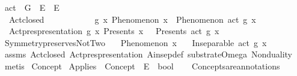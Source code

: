 \begin{isabellebody}
\ act\ {\isacharcolon}{\kern0pt}{\isacharcolon}{\kern0pt}\ {\isachardoublequoteopen}G\ {\isasymRightarrow}\ E\ {\isasymRightarrow}\ E{\isachardoublequoteclose}\ \ \ \isanewline
\isanewline
{}\isamarkupfalse%
\ \isanewline
\ \ Act{\isacharunderscore}{\kern0pt}closed{\isacharcolon}{\kern0pt}\ \ \ \ \ \ \ \ \ \ \ \ {\isachardoublequoteopen}{\isasymforall}g\ x{\isachardot}{\kern0pt}\ Phenomenon\ x\ {\isasymlongrightarrow}\ Phenomenon\ {\isacharparenleft}{\kern0pt}act\ g\ x{\isacharparenright}{\kern0pt}{\isachardoublequoteclose}\ \isanewline
\ \ Act{\isacharunderscore}{\kern0pt}pres{\isacharunderscore}{\kern0pt}presentation{\isacharcolon}{\kern0pt}\ {\isachardoublequoteopen}{\isasymforall}g\ x{\isachardot}{\kern0pt}\ Presents\ x\ {\isasymOmega}\ {\isasymlongrightarrow}\ Presents\ {\isacharparenleft}{\kern0pt}act\ g\ x{\isacharparenright}{\kern0pt}\ {\isasymOmega}{\isachardoublequoteclose}\isanewline
\isanewline
{}\isamarkupfalse%
\ Symmetry{\isacharunderscore}{\kern0pt}preserves{\isacharunderscore}{\kern0pt}NotTwo{\isacharcolon}{\kern0pt}\isanewline
\ \ \ {\isachardoublequoteopen}Phenomenon\ x{\isachardoublequoteclose}\isanewline
\ \ \ {\isachardoublequoteopen}Inseparable\ {\isacharparenleft}{\kern0pt}act\ g\ x{\isacharparenright}{\kern0pt}\ {\isasymOmega}{\isachardoublequoteclose}\isanewline
%
\isadelimproof
\ \ %
\endisadelimproof
%
\isatagproof
{}\isamarkupfalse%
\ assms\ Act{\isacharunderscore}{\kern0pt}closed\ Act{\isacharunderscore}{\kern0pt}pres{\isacharunderscore}{\kern0pt}presentation\ A{}{\isacharunderscore}{\kern0pt}insep{\isacharunderscore}{\kern0pt}def\ substrate{\isacharunderscore}{\kern0pt}Omega\ Nonduality\isanewline
\ \ \isamarkupfalse%
\ {\isacharparenleft}{\kern0pt}metis{\isacharparenright}{\kern0pt}%
\endisatagproof
{\isafoldproof}%
%
\isadelimproof
%
\endisadelimproof
%
\isadelimdocument
%
\endisadelimdocument
%
\isatagdocument
%
\isamarkuptrue%
%
\endisatagdocument
{\isafolddocument}%
%
\isadelimdocument
%
\endisadelimdocument
{}\isamarkupfalse%
\ Concept\isanewline
{}\isamarkupfalse%
\ Applies\ {\isacharcolon}{\kern0pt}{\isacharcolon}{\kern0pt}\ {\isachardoublequoteopen}Concept\ {\isasymRightarrow}\ E\ {\isasymRightarrow}\ bool{\isachardoublequoteclose}\isanewline
\isanewline
{}\isamarkupfalse%
\ \isanewline
\ \ Concepts{\isacharunderscore}{\kern0pt}are{\isacharunderscore}{\kern0pt}annotations{\isacharcolon}{\kern0pt}\isanewline

\end{isabellebody}
